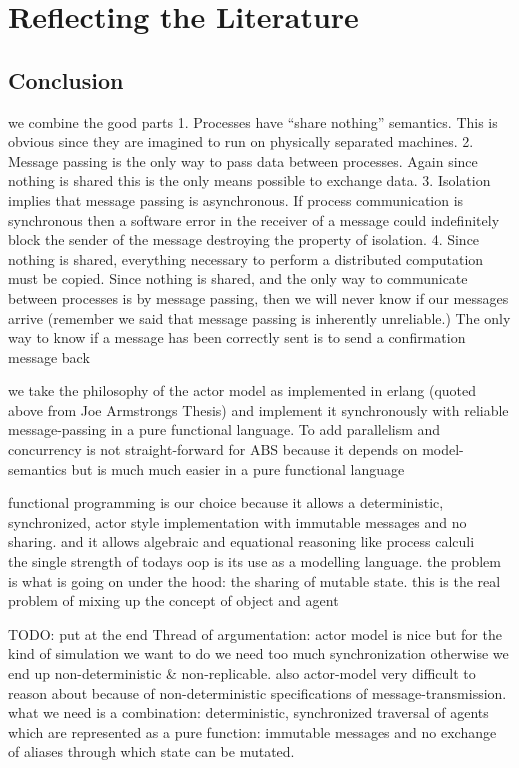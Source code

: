 \chapter{Reflecting the Literature}
\label{chap:refl}

\section{Conclusion}
we combine the good parts
1. Processes have “share nothing” semantics. This is obvious since they are imagined to run on physically separated machines.
2. Message passing is the only way to pass data between processes. Again since nothing is shared this is the only means possible to exchange data.
3. Isolation implies that message passing is asynchronous. If process communication is synchronous then a software error in the receiver of a message could indefinitely block the sender of the message destroying the property of isolation.
4. Since nothing is shared, everything necessary to perform a distributed computation must be copied. Since nothing is shared, and the only way to communicate between processes is by message passing, then we will never know if our messages arrive (remember we said that message passing is inherently unreliable.) The only way to know if a message has been correctly sent is to send a confirmation message back

we take the philosophy of the actor model as implemented in erlang (quoted above from Joe Armstrongs Thesis) and
implement it synchronously with reliable message-passing in a pure functional language. To add parallelism and concurrency
is not straight-forward for ABS because it depends on model-semantics but
is much much easier in a pure functional language


functional programming is our choice because it allows a deterministic, synchronized, actor style  implementation with  immutable messages and no sharing. and it allows algebraic and equational reasoning like process calculi\\

the single strength of todays oop is its use as a modelling language. the problem is what is going on under the hood: the sharing of mutable state. this is the real problem of mixing up the concept of object and agent

TODO: put at the end
Thread of argumentation: actor model is nice but for the kind of simulation we want to do we need too much synchronization otherwise we end up non-deterministic \& non-replicable. also actor-model very difficult to reason about because of non-deterministic specifications of message-transmission. what we need is a combination: deterministic, synchronized traversal of agents which are represented as a pure function: immutable messages and no exchange of aliases through which state can be mutated.

